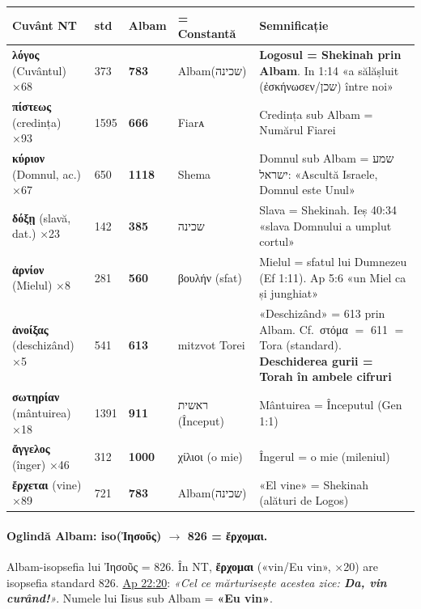 \documentclass[12pt,a4paper,twoside,openany]{book}
\begin{document}
\begin{center}
\footnotesize
\begin{tabular}{L{2.6cm}C{0.8cm}C{1cm}L{2.5cm}L{6.3cm}}
\toprule
{}
\textbf{Cuvânt NT} & \textbf{std} & \textbf{Albam} & \textbf{= Constantă} & \textbf{Semnificație} \\
\midrule
\textbf{λόγος} (Cuvântul) ×68 & 373 & \textbf{783} & Albam(שכינה) & \textbf{Logosul = Shekinah prin Albam}. In 1:14 «a sălășluit (ἐσκήνωσεν/שכן) între noi» \\
\textbf{πίστεως} (credința) ×93 & 1595 & \textbf{666} & Fiarᴀ & Credința sub Albam = Numărul Fiarei \\
\textbf{κύριον} (Domnul, ac.) ×67 & 650 & \textbf{1118} & Shema & Domnul sub Albam = שמע ישראל: «Ascultă Israele, Domnul este Unul» \\
\textbf{δόξῃ} (slavă, dat.) ×23 & 142 & \textbf{385} & שכינה & Slava = Shekinah. Ieș 40:34 «slava Domnului a umplut cortul» \\
\textbf{ἀρνίον} (Mielul) ×8 & 281 & \textbf{560} & βουλήν (sfat) & Mielul = sfatul lui Dumnezeu (Ef 1:11). Ap 5:6 «un Miel ca și junghiat» \\
\textbf{ἀνοίξας} (deschizând) ×5 & 541 & \textbf{613} & mitzvot Torei & «Deschizând» = 613 prin Albam. Cf.~στόμα $=$ 611 $=$ Tora (standard). \textbf{Deschiderea gurii = Torah în ambele cifruri} \\
\textbf{σωτηρίαν} (mântuirea) ×18 & 1391 & \textbf{911} & ראשית (Început) & Mântuirea = Începutul (Gen 1:1) \\
\textbf{ἄγγελος} (înger) ×46 & 312 & \textbf{1000} & χίλιοι (o mie) & Îngerul = o mie (mileniul) \\
\textbf{ἔρχεται} (vine) ×89 & 721 & \textbf{783} & Albam(שכינה) & «El vine» = Shekinah (alături de Logos) \\
\bottomrule
\end{tabular}
\end{center}

\paragraph*{Oglindă Albam: iso(Ἰησοῦς) $\to$ 826 = ἔρχομαι.} Albam-isopsefia lui Ἰησοῦς = 826. În NT, \textbf{ἔρχομαι} («vin/Eu vin», ×20) are isopsefia standard 826. \href{https://bibliaortodoxa.ro/carte.php?id=78\&cap=22\#20}{Ap 22:20}: \textit{«Cel ce mărturisește acestea zice: \textbf{Da, vin curând!}»}. Numele lui Iisus sub Albam = \textbf{«Eu vin»}.
\end{document}
